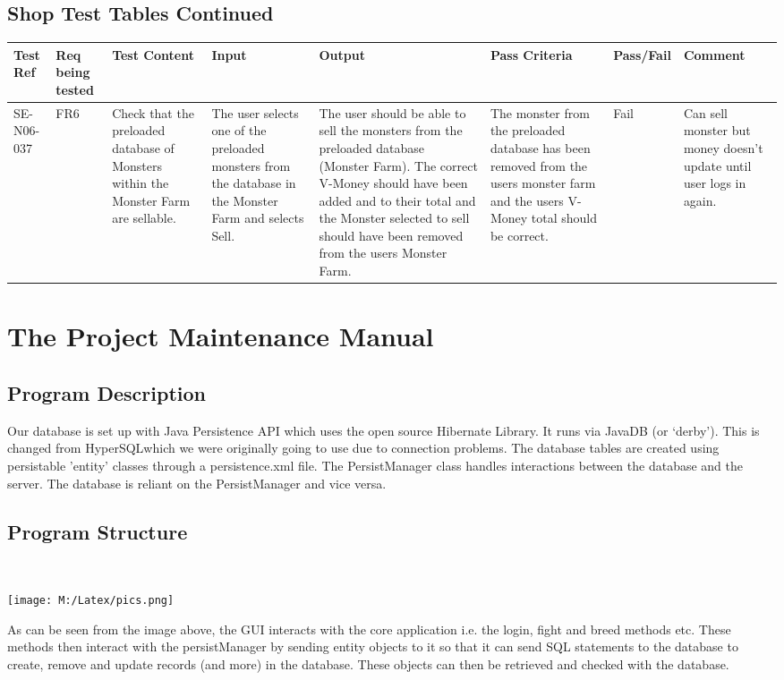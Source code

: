\documentclass[titlepage]{article}
\begin{document}
{\subsection{Shop Test Tables Continued}
\begin{sideways}
\begin{tabular}{|p{1cm}|p{1cm}|p{3cm}|p{3cm}|p{2cm}|p{3cm}|p{2cm}|p{2cm}|}
\hline
Test Ref & Req being tested & Test Content & Input & Output & Pass Criteria & Pass/Fail & Comment \\ 
\hline
SE-N06-037 & FR6 & Check that the preloaded database of Monsters within the Monster Farm are sellable. & The user selects one of the preloaded monsters from the database in the Monster Farm and selects Sell. & The user should be able to sell the monsters from the preloaded database (Monster Farm). The correct V-Money should have been added and to their total and the Monster selected to sell should have been removed from the users Monster Farm. & The monster from the preloaded database has been removed from the users monster farm and the users V-Money total should be correct. & Fail & Can sell monster but money doesn't update until user logs in again. \\
\hline
\end{tabular}
\end{sideways}
\newpage
\section {The Project Maintenance Manual}
\subsection {Program Description}
Our database is set up with Java Persistence API which uses the open source Hibernate Library. It runs via JavaDB (or ‘derby’). This is changed from HyperSQLwhich we were originally going to use due to connection problems. The database tables are created using persistable 'entity' classes through a persistence.xml file. The PersistManager class handles interactions between the database and the server. The database is reliant on the PersistManager and vice versa.
\subsection {Program Structure}
\\
\begin{center}
\texttt{[image: M:/Latex/pics.png]}
\label{fig:pic}
\\
\end{center}
{As can be seen from the image above, the GUI interacts with the core application i.e. the login, fight and breed methods etc. These methods then interact with the persistManager by sending entity objects to it so that it can send SQL statements to the database to create, remove and update records (and more) in the database. These objects can then be retrieved and checked with the database.}
}
\end{document}
